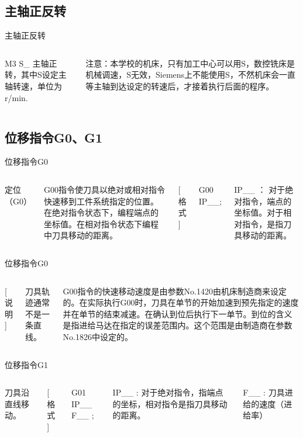 \documentclass[UTF8,zihao=-4]{ctexbeamer}
\begin{document}
\subsection{主轴正反转}

\begin{frame}{主轴正反转}
    \begin{columns}
        \column{\textwidth}
  M3 S\_ 主轴正转，其中S设定主轴转速，单位为r/min.
  
  
  注意：本学校的机床，只有加工中心可以用S，数控铣床是机械调速，S无效，Siemens上不能使用S，不然机床会一直等主轴到达设定的转速后，才接着执行后面的程序。
               
    \end{columns}
\end{frame}

\subsection{位移指令G0、G1}
\begin{frame}{位移指令G0}
    \begin{columns}
        \column{\textwidth}
定位（G0）

G00指令使刀具以绝对或相对指令快速移到工件系统指定的位置。在绝对指令状态下，编程端点的坐标值。在相对指令状态下编程中刀具移动的距离。

[ 格式 ]

G00 IP\_\_;

IP\_\_ ：
对于绝对指令，端点的坐标值。对于相对指令，是指刀具移动的距离。
    \end{columns}
\end{frame}

\begin{frame}{位移指令G0}
    \begin{columns}
        \column{\textwidth}
        [ 说明 ]
        
        刀具轨迹通常不是一条直线。
        
        G00指令的快速移动速度是由参数No.1420由机床制造商来设定的。在实际执行G00时，刀具在单节的开始加速到预先指定的速度并在单节的结束减速。在确认到位后执行下一单节。到位的含义是指进给马达在指定的误差范围内。这个范围是由制造商在参数No.1826中设定的。
        
    \end{columns}
\end{frame}

\begin{frame}{位移指令G1}
    \begin{columns}
        \column{\textwidth}
        刀具沿直线移动。
        
        [ 格式 ]
        
        G01 IP\_\_ F\_\_ ;
        
        IP\_\_ : 对于绝对指令，指端点的坐标，相对指令是指刀具移动的距离。
        
        F\_\_ : 刀具进给的速度（进给率）
        
    \end{columns}
\end{frame}
\end{document}
